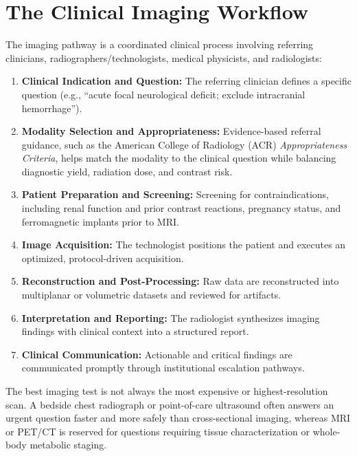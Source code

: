 \section{The Clinical Imaging Workflow}
The imaging pathway is a coordinated clinical process involving referring clinicians, radiographers/technologists, medical physicists, and radiologists:
\begin{enumerate}
    \item \textbf{Clinical Indication and Question:} The referring clinician defines a specific question (e.g., ``acute focal neurological deficit; exclude intracranial hemorrhage'').
    \item \textbf{Modality Selection and Appropriateness:} Evidence-based referral guidance, such as the American College of Radiology (ACR) \textit{Appropriateness Criteria}, helps match the modality to the clinical question while balancing diagnostic yield, radiation dose, and contrast risk.
    \item \textbf{Patient Preparation and Screening:} Screening for contraindications, including renal function and prior contrast reactions, pregnancy status, and ferromagnetic implants prior to MRI.
    \item \textbf{Image Acquisition:} The technologist positions the patient and executes an optimized, protocol-driven acquisition.
    \item \textbf{Reconstruction and Post-Processing:} Raw data are reconstructed into multiplanar or volumetric datasets and reviewed for artifacts.
    \item \textbf{Interpretation and Reporting:} The radiologist synthesizes imaging findings with clinical context into a structured report.
    \item \textbf{Clinical Communication:} Actionable and critical findings are communicated promptly through institutional escalation pathways.
\end{enumerate}

\begin{pearlbox}
The best imaging test is not always the most expensive or highest-resolution scan. A bedside chest radiograph or point-of-care ultrasound often answers an urgent question faster and more safely than cross-sectional imaging, whereas MRI or PET/CT is reserved for questions requiring tissue characterization or whole-body metabolic staging.
\end{pearlbox}

\clearpage
